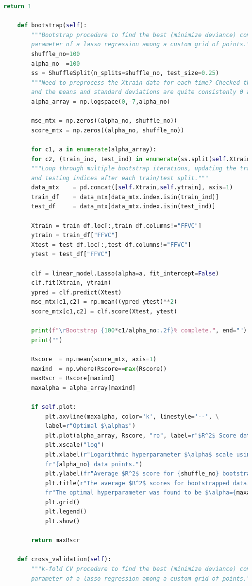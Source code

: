 \documentclass[]{article}
\begin{document}
\begin{lstlisting}[language=Python]
		return 1
	
	def bootstrap(self):
		"""Bootstrap procedure to find the best (minimize deviance) complexity
		parameter of a lasso regression among a custom grid of points."""
		shuffle_no=100
		alpha_no  =100
		ss = ShuffleSplit(n_splits=shuffle_no, test_size=0.25)
		"""Need to preprocess the Xtrain data for each time? Checked the data
		and the means and standard deviations are quite consistenly 0 and 1."""
		alpha_array = np.logspace(0,-7,alpha_no)
		
		mse_mtx = np.zeros((alpha_no, shuffle_no))
		score_mtx = np.zeros((alpha_no, shuffle_no))
		
		for c1, a in enumerate(alpha_array):
		for c2, (train_ind, test_ind) in enumerate(ss.split(self.Xtrain)):
		"""Loop through multiple bootstrap iterations, updating the training
		and testing indices after each train/test split."""
		data_mtx    = pd.concat([self.Xtrain,self.ytrain], axis=1)
		train_df    = data_mtx[data_mtx.index.isin(train_ind)]
		test_df     = data_mtx[data_mtx.index.isin(test_ind)]
		
		Xtrain = train_df.loc[:,train_df.columns!="FFVC"]
		ytrain = train_df["FFVC"]
		Xtest = test_df.loc[:,test_df.columns!="FFVC"]
		ytest = test_df["FFVC"]
		
		clf = linear_model.Lasso(alpha=a, fit_intercept=False)
		clf.fit(Xtrain, ytrain)
		ypred = clf.predict(Xtest)
		mse_mtx[c1,c2] = np.mean((ypred-ytest)**2)
		score_mtx[c1,c2] = clf.score(Xtest, ytest)
		
		print(f"\rBootstrap {100*c1/alpha_no:.2f}% complete.", end="")
		print("")
		
		Rscore  = np.mean(score_mtx, axis=1)
		maxind  = np.where(Rscore==max(Rscore))
		maxRscr = Rscore[maxind]
		maxalpha = alpha_array[maxind]
		
		if self.plot:
			plt.axvline(maxalpha, color='k', linestyle='--', \
			label=r"Optimal $\alpha$")
			plt.plot(alpha_array, Rscore, "ro", label=r"$R^2$ Score data")
			plt.xscale("log")
			plt.xlabel(r"Logarithmic hyperparameter $\alpha$ scale using "+\
			fr"{alpha_no} data points.")
			plt.ylabel(fr"Average $R^2$ score for {shuffle_no} bootstrap splits.")
			plt.title(r"The average $R^2$ scores for bootstrapped data."+ "\n"+\
			fr"The optimal hyperparameter was found to be $\alpha={maxalpha}$")
			plt.grid()
			plt.legend()
			plt.show()
			
		return maxRscr
	
	def cross_validation(self):
		"""k-fold CV procedure to find the best (minimize deviance) complexity
		parameter of a lasso regression among a custom grid of points."""
		

\end{lstlisting}
\end{document}
